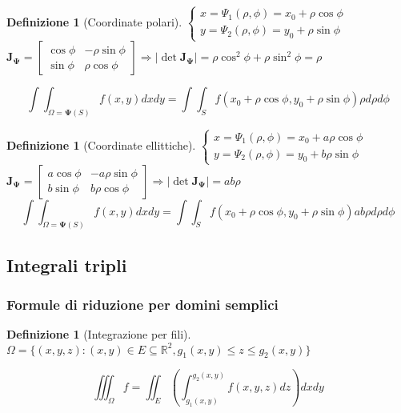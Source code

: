 \documentclass[a4paper,12pt]{report}
\theoremstyle{mystyle}
\newtheorem{definition}[theorem]{Definizione}
\begin{document}
\begin{definition}[Coordinate polari]
    \(
    \begin{cases}
        x = \Psi_1(\rho, \phi) = x_0 + \rho \cos \phi \\
        y = \Psi_2 (\rho, \phi) = y_0 + \rho \sin \phi
    \end{cases}
    \) \\
    \(\mathbf{J_\Psi} =
        \begin{bmatrix}
            \cos \phi & - \rho \sin \phi \\
            \sin \phi & \rho \cos \phi
        \end{bmatrix}
        \Rightarrow \lvert \det \mathbf{J_\Psi} \rvert = \rho \cos^2 \phi + \rho \sin^2 \phi = \rho
    \)

    \[
    \int \int _{\Omega = \mathbf{\Psi}(S)} f(x,y) dx dy = \int \int _S f (x_0 + \rho \cos \phi, y_0 + \rho \sin \phi) \rho d \rho d \phi
    \]
\end{definition}

\begin{definition}[Coordinate ellittiche]
    \(
    \begin{cases}
        x = \Psi_1(\rho,\phi)=x_0 + a \rho \cos \phi \\
        y = \Psi_2(\rho,\phi)=y_0+b\rho \sin \phi
    \end{cases}
    \)\\
    \(\mathbf{J_\Psi}=
        \begin{bmatrix}
            a \cos \phi & - a \rho \sin \phi \\
            b \sin \phi & b \rho \cos \phi
        \end{bmatrix}
        \Rightarrow \lvert \det \mathbf{J_\Psi}\rvert = ab\rho
    \)
    \[
        \int \int _{\Omega = \mathbf{\Psi}(S)} f(x,y) dx dy = \int \int _S f (x_0 + \rho \cos \phi, y_0 + \rho \sin \phi) ab\rho d \rho d \phi
    \]
\end{definition}



\subsection{Integrali tripli}
\subsubsection{Formule di riduzione per domini semplici}
\begin{definition}[Integrazione per fili]
\(\Omega = \{(x,y,z): (x,y) \in E \subseteq \mathbb R^2, g_1(x,y) \leq z \leq g_2(x,y)\}\)

\[
    \iiint _\Omega f = \iint_E \left(\int_{g_1(x,y)}^{g_2(x,y)} f(x,y,z) dz\right)dxdy
\]
\end{definition}
\end{document}
